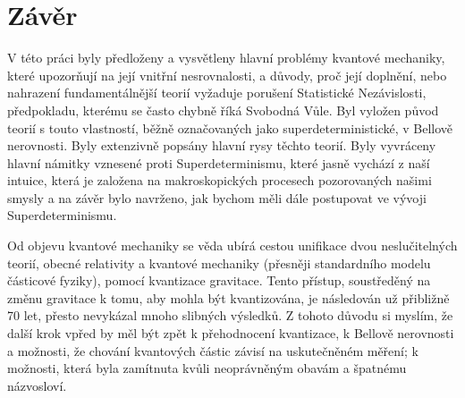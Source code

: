 \section*{Závěr}
\label{sec:conc}

V této práci byly předloženy a vysvětleny hlavní problémy kvantové mechaniky, které upozorňují na její vnitřní nesrovnalosti, a důvody, proč její doplnění, nebo nahrazení fundamentálnější teorií vyžaduje porušení Statistické Nezávislosti, předpokladu, kterému se často chybně říká Svobodná Vůle. Byl vyložen původ teorií s touto vlastností, běžně označovaných jako superdeterministické, v Bellově nerovnosti. Byly extenzivně popsány hlavní rysy těchto teorií. Byly vyvráceny hlavní námitky vznesené proti Superdeterminismu, které jasně vychází z naší intuice, která je založena na makroskopických procesech pozorovaných našimi smysly a na závěr bylo navrženo, jak bychom měli dále postupovat ve vývoji Superdeterminismu.

Od objevu kvantové mechaniky se věda ubírá cestou unifikace dvou neslučitelných teorií, obecné relativity a kvantové mechaniky (přesněji standardního modelu částicové fyziky), pomocí kvantizace gravitace. Tento přístup, soustředěný na změnu gravitace k tomu, aby mohla být kvantizována, je následován už přibližně 70 let, přesto nevykázal mnoho slibných výsledků. Z tohoto důvodu si myslím, že další krok vpřed by měl být zpět k přehodnocení kvantizace, k Bellově nerovnosti a možnosti, že chování kvantových částic závisí na uskutečněném měření; k možnosti, která byla zamítnuta kvůli neoprávněným obavám a špatnému názvosloví.